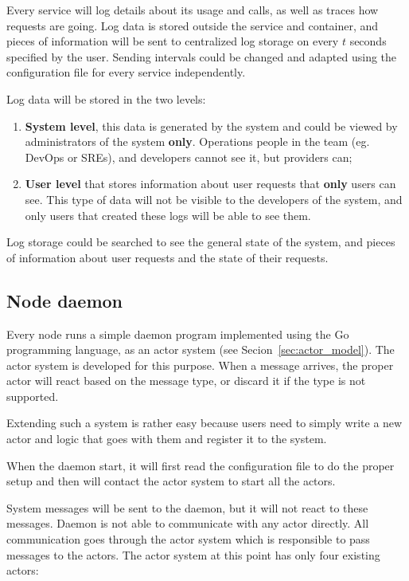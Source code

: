 Every service will log details about its usage and calls, as well as traces how requests are going. Log data is stored outside the service and container, and pieces of information will be sent to centralized log storage on every $t$ seconds specified by the user. Sending intervals could be changed and adapted using the configuration file for every service independently.

Log data will be stored in the two levels:

\begin{enumerate}[start=1,label={(\bfseries \arabic*)}]
	\item \textbf{System level}, this data is generated by the system and could be viewed by administrators of the system \textbf{only}. Operations people in the team (eg. DevOps or SREs), and developers cannot see it, but providers can;
	\item \textbf{User level} that stores information about user requests that \textbf{only} users can see. This type of data will not be visible to the developers of the system, and only users that created these logs will be able to see them.
\end{enumerate}

\noindent
Log storage could be searched to see the general state of the system, and pieces of information about user requests and the state of their requests.
%
%
\subsection{Node daemon}\label{sec:node_daemon}
%
Every node runs a simple daemon program implemented using the Go programming language, as an actor system (see Secion~\ref{sec:actor_model}). The actor system is developed for this purpose. When a message arrives, the proper actor will react based on the message type, or discard it if the type is not supported. 

Extending such a system is rather easy because users need to simply write a new actor and logic that goes with them and register it to the system.

When the daemon start, it will first read the configuration file to do the proper setup and then will contact the actor system to start all the actors. 

System messages will be sent to the daemon, but it will not react to these messages. Daemon is not able to communicate with any actor directly. All communication goes through the actor system which is responsible to pass messages to the actors. The actor system at this point has only four existing actors:

